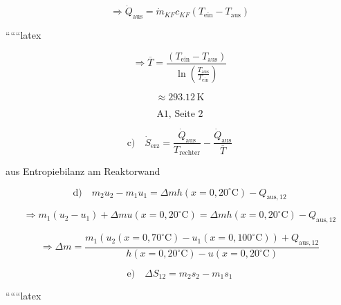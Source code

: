 \[
\Rightarrow \dot{Q}_{\text{aus}} = \dot{m}_{KF} c_{KF} (T_{\text{ein}} - T_{\text{aus}})
\]

``````latex


\[
\Rightarrow \overline{T} = \frac{(T_{\text{ein}} - T_{\text{aus}})}{\ln \left( \frac{T_{\text{aus}}}{T_{\text{ein}}} \right)}
\]

\[
\approx 293.12 \, \text{K}
\]

\[
\boxed{\text{A1, Seite 2}}
\]

\[
\text{c)} \quad \dot{S}_{\text{erz}} = \frac{\dot{Q}_{\text{aus}}}{T_{\text{rechter}}} - \frac{\dot{Q}_{\text{aus}}}{\overline{T}}
\]

aus Entropiebilanz am Reaktorwand

\[
\text{d)} \quad m_2 u_2 - m_1 u_1 = \Delta m h(x=0, 20^\circ \text{C}) - Q_{\text{aus}, 12}
\]

\[
\Rightarrow m_1 (u_2 - u_1) + \Delta m u(x=0, 20^\circ \text{C}) = \Delta m h(x=0, 20^\circ \text{C}) - Q_{\text{aus}, 12}
\]

\[
\Rightarrow \Delta m = \frac{m_1 \left( u_2 (x=0, 70^\circ \text{C}) - u_1 (x=0, 100^\circ \text{C}) \right) + Q_{\text{aus}, 12}}{h(x=0, 20^\circ \text{C}) - u(x=0, 20^\circ \text{C})}
\]

\[
\text{e)} \quad \Delta S_{12} = m_2 s_2 - m_1 s_1
\]

``````latex


